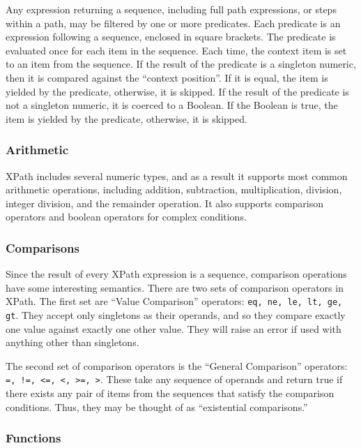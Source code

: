 \documentclass{scrartcl}
\begin{document}
Any expression returning a sequence, including full path expressions, or steps
within a path, may be filtered by one or more predicates. Each predicate is an
expression following a sequence, enclosed in square brackets. The predicate is
evaluated once for each item in the sequence. Each time, the context item is set
to an item from the sequence. If the result of the predicate is a singleton
numeric, then it is compared against the ``context position''. If it is equal,
the item is yielded by the predicate, otherwise, it is skipped. If the result of
the predicate is not a singleton numeric, it is coerced to a Boolean. If the
Boolean is true, the item is yielded by the predicate, otherwise, it is skipped.

\subsubsection{Arithmetic}

XPath includes several numeric types, and as a result it supports most common
arithmetic operations, including addition, subtraction, multiplication,
division, integer division, and the remainder operation. It also supports
comparison operators and boolean operators for complex conditions.

\subsubsection{Comparisons}

Since the result of every XPath expression is a sequence, comparison operations
have some interesting semantics. There are two sets of comparison operators in
XPath. The first set are ``Value Comparison'' operators: \texttt{eq, ne, le, lt,
  ge, gt}. They accept only singletons as their operands, and so they compare
exactly one value against exactly one other value. They will raise an error if
used with anything other than singletons.

The second set of comparison operators is the ``General Comparison'' operators:
\texttt{=, !=, <=, <, >=, >}. These take any sequence of operands and return
true if there exists any pair of items from the sequences that satisfy the
comparison conditions. Thus, they may be thought of as ``existential
comparisons.''

\subsubsection{Functions}
\end{document}
